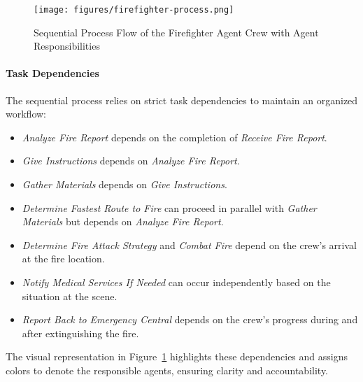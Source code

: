\begin{figure}[h!]
    \centering
    \texttt{[image: figures/firefighter-process.png]}
    \caption{Sequential Process Flow of the Firefighter Agent Crew with Agent Responsibilities}
    \label{fig:firefighter_flow}
\end{figure}

\paragraph{Task Dependencies}
The sequential process relies on strict task dependencies to maintain an organized workflow:
\begin{itemize}
    \item \textit{Analyze Fire Report} depends on the completion of \textit{Receive Fire Report}.
    \item \textit{Give Instructions} depends on \textit{Analyze Fire Report}.
    \item \textit{Gather Materials} depends on \textit{Give Instructions}.
    \item \textit{Determine Fastest Route to Fire} can proceed in parallel with \textit{Gather Materials} but depends on \textit{Analyze Fire Report}.
    \item \textit{Determine Fire Attack Strategy} and \textit{Combat Fire} depend on the crew’s arrival at the fire location.
    \item \textit{Notify Medical Services If Needed} can occur independently based on the situation at the scene.
    \item \textit{Report Back to Emergency Central} depends on the crew’s progress during and after extinguishing the fire.
\end{itemize}

The visual representation in Figure~\ref{fig:firefighter_flow} highlights these dependencies and assigns colors to denote the responsible agents, ensuring clarity and accountability.
